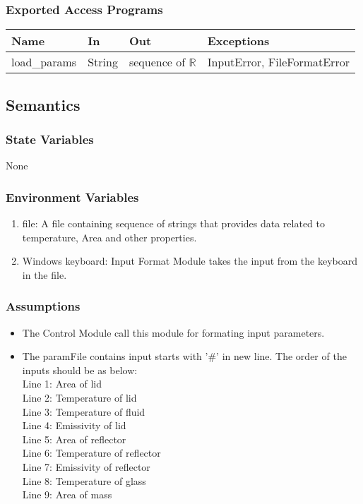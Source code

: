 \documentclass[12pt, titlepage]{article}
\begin{document}
\subsubsection{Exported Access Programs}

\begin{center}
\begin{tabular}{p{2.5cm} p{3.5cm} p{4cm} p{4cm}}
\hline
\textbf{Name} & \textbf{In} & \textbf{Out} & \textbf{Exceptions} \\
\hline
load\_params & String & sequence of $\mathbb{R}$ & InputError, FileFormatError \\
\hline
\end{tabular}
\end{center}

\subsection{Semantics}

\subsubsection{State Variables}

None

\subsubsection{Environment Variables}

\begin{enumerate}
    \item file: A file containing sequence of strings that provides data related to temperature, Area and other properties.
        \item Windows keyboard: Input Format Module takes the input from the keyboard in the file. 
\end{enumerate}


\subsubsection{Assumptions}

\begin{itemize}
    \item The Control Module call this module for formating input parameters. 
    \item The paramFile contains input starts with '\#' in new line. The order of the inputs should be as below: \\ 
    Line 1: Area of lid \\
    Line 2: Temperature of lid \\
    Line 3: Temperature of fluid \\
    Line 4: Emissivity of lid \\
    Line 5: Area of reflector \\ 
    Line 6: Temperature of reflector \\ 
    Line 7: Emissivity of reflector \\ 
    Line 8: Temperature of glass \\
    Line 9: Area of mass 
\end{itemize}
\end{document}
